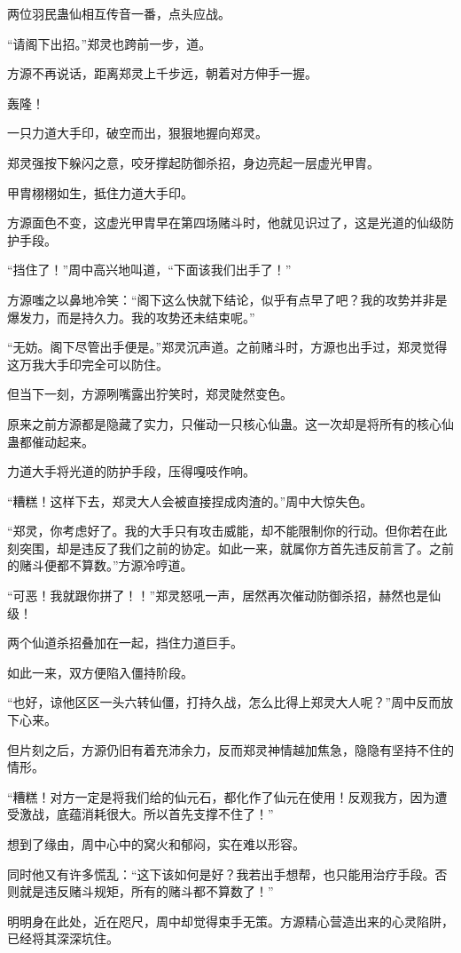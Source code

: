 \begin{this_body}
两位羽民蛊仙相互传音一番，点头应战。

“请阁下出招。”郑灵也跨前一步，道。

方源不再说话，距离郑灵上千步远，朝着对方伸手一握。

轰隆！

一只力道大手印，破空而出，狠狠地握向郑灵。

郑灵强按下躲闪之意，咬牙撑起防御杀招，身边亮起一层虚光甲胄。

甲胄栩栩如生，抵住力道大手印。

方源面色不变，这虚光甲胄早在第四场赌斗时，他就见识过了，这是光道的仙级防护手段。

“挡住了！”周中高兴地叫道，“下面该我们出手了！”

方源嗤之以鼻地冷笑：“阁下这么快就下结论，似乎有点早了吧？我的攻势并非是爆发力，而是持久力。我的攻势还未结束呢。”

“无妨。阁下尽管出手便是。”郑灵沉声道。之前赌斗时，方源也出手过，郑灵觉得这万我大手印完全可以防住。

但当下一刻，方源咧嘴露出狞笑时，郑灵陡然变色。

原来之前方源都是隐藏了实力，只催动一只核心仙蛊。这一次却是将所有的核心仙蛊都催动起来。

力道大手将光道的防护手段，压得嘎吱作响。

“糟糕！这样下去，郑灵大人会被直接捏成肉渣的。”周中大惊失色。

“郑灵，你考虑好了。我的大手只有攻击威能，却不能限制你的行动。但你若在此刻突围，却是违反了我们之前的协定。如此一来，就属你方首先违反前言了。之前的赌斗便都不算数。”方源冷哼道。

“可恶！我就跟你拼了！！”郑灵怒吼一声，居然再次催动防御杀招，赫然也是仙级！

两个仙道杀招叠加在一起，挡住力道巨手。

如此一来，双方便陷入僵持阶段。

“也好，谅他区区一头六转仙僵，打持久战，怎么比得上郑灵大人呢？”周中反而放下心来。

但片刻之后，方源仍旧有着充沛余力，反而郑灵神情越加焦急，隐隐有坚持不住的情形。

“糟糕！对方一定是将我们给的仙元石，都化作了仙元在使用！反观我方，因为遭受激战，底蕴消耗很大。所以首先支撑不住了！”

想到了缘由，周中心中的窝火和郁闷，实在难以形容。

同时他又有许多慌乱：“这下该如何是好？我若出手想帮，也只能用治疗手段。否则就是违反赌斗规矩，所有的赌斗都不算数了！”

明明身在此处，近在咫尺，周中却觉得束手无策。方源精心营造出来的心灵陷阱，已经将其深深坑住。


\end{this_body}
